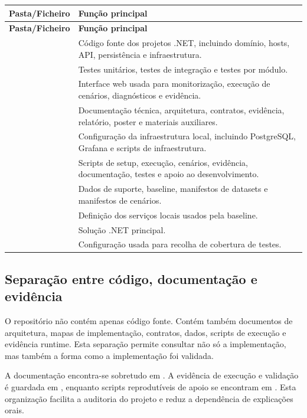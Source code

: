 \begin{longtable}{L{0.28\textwidth} L{0.62\textwidth}}
\toprule
\textbf{Pasta/Ficheiro} & \textbf{Função principal} \\
\midrule
\endfirsthead
\toprule
\textbf{Pasta/Ficheiro} & \textbf{Função principal} \\
\midrule
\endhead
{} & Código fonte dos projetos .NET, incluindo domínio, hosts, API, persistência e infraestrutura. \\
 & Testes unitários, testes de integração e testes por módulo. \\
 & Interface web usada para monitorização, execução de cenários, diagnósticos e evidência. \\
 & Documentação técnica, arquitetura, contratos, evidência, relatório, poster e materiais auxiliares. \\
 & Configuração da infraestrutura local, incluindo PostgreSQL, Grafana e scripts de infraestrutura. \\
 & Scripts de setup, execução, cenários, evidência, documentação, testes e apoio ao desenvolvimento. \\
 & Dados de suporte, baseline, manifestos de datasets e manifestos de cenários. \\
 & Definição dos serviços locais usados pela baseline. \\
 & Solução .NET principal. \\
 & Configuração usada para recolha de cobertura de testes. \\
\bottomrule
\end{longtable}

\subsection{Separação entre código, documentação e evidência}

O repositório não contém apenas código fonte. Contém também documentos de arquitetura, mapas de implementação, contratos, dados, scripts de execução e evidência runtime. Esta separação permite consultar não só a implementação, mas também a forma como a implementação foi validada.

A documentação encontra-se sobretudo em . A evidência de execução e validação é guardada em , enquanto scripts reprodutíveis de apoio se encontram em . Esta organização facilita a auditoria do projeto e reduz a dependência de explicações orais.

